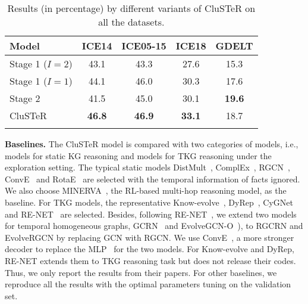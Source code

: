\documentclass[11pt,a4paper]{article}
\begin{document}
\begin{table}
\small
\centering
\setlength{\tabcolsep}{0.3em}
\begin{tabular}{lcccc}
\toprule
Model   & ICE14  & ICE05-15  & ICE18  & GDELT \\
\midrule
Stage 1 ($I=2$)       &43.1  &43.3 &27.6 &15.3\\
Stage 1 ($I=1$)       &44.1  &46.0 &30.3 &17.6\\
Stage 2        &41.5  &45.0 &30.1 &\textbf{19.6}    \\
CluSTeR               &\textbf{46.8}  &\textbf{46.9} &\textbf{33.1} &18.7\\
\bottomrule
\vspace{-4mm}
\end{tabular}
\caption{Results (in percentage) by different variants of CluSTeR on all the datasets.}
\label{table:ablation}
\vspace{-4mm}
\end{table}
  
{\bf Baselines.} The CluSTeR model is compared with two categories of models,
i.e., models for static KG reasoning and models for TKG reasoning under the
exploration setting. The typical static models
DistMult~\cite{yang2014embedding}, ComplEx~\cite{trouillon2016complex},
RGCN~\cite{schlichtkrull2018modeling}, ConvE~\cite{dettmers2018convolutional}
and RotaE~\cite{sun2018rotate} are selected with the temporal information of
facts ignored. We also choose MINERVA~\cite{das2018go}, the RL-based multi-hop
reasoning model, as the baseline. For TKG models, the representative
Know-evolve~\cite{trivedi2017know}, DyRep~\cite{trivedi2018dyrep},
CyGNet~\cite{zhu2020learning} and RE-NET~\cite{jin2020Renet} are selected.
Besides, following RE-NET~\cite{jin2020Renet}, we extend two models for temporal
homogeneous graphs, GCRN~\cite{seo2018structured} and
EvolveGCN-O~\cite{pareja2019evolvegcn}), to RGCRN and EvolveRGCN by replacing
GCN with RGCN. We use ConvE~\cite{dettmers2018convolutional}, a more stronger
decoder to replace the MLP~\cite{jin2020Renet} for the two models. For
Know-evolve and DyRep, RE-NET extends them to TKG reasoning task but does not
release their codes. Thus, we only report the results from their papers. For
other baselines, we reproduce all the results with the optimal parameters tuning
on the validation set. 
\end{document}
